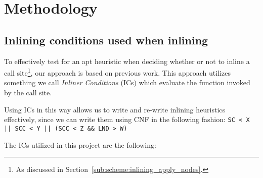 
\clearpage
\section{Methodology}
\label{sec:methodology}


\subsection{Inlining conditions used when inlining}
\label{sub:meth:inlining_conditions}

To effectively test for an apt heuristic when deciding whether or not to inline
a call site\footnote{As discussed in
Section~\ref{sub:scheme:inlining_apply_nodes}.}, our approach is based on
previous work\cite{deshpande2012statically}\cite{AdaptvCompilAndInlingWaterman}.
This approach utilizes something we call  \textit{Inliner Conditions} (ICs)
which evaluate the function invoked by the call site.

Using ICs in this way allows us to write and re-write inlining heuristics
effectively, since we can write them using CNF in the following fashion:
\lstinline"SC < X || SCC < Y || (SCC < Z && LND > W)"

The ICs utilized in this project are the following:

